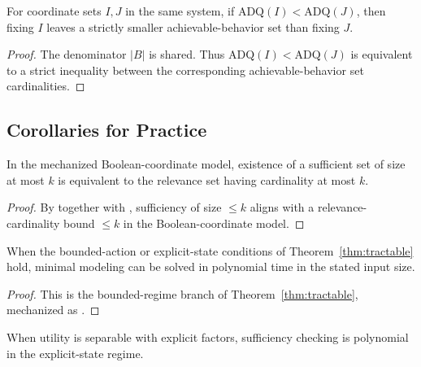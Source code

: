 \begin{proposition}\label{prop:adq-ordering}
For coordinate sets $I,J$ in the same system, if $\mathrm{ADQ}(I) < \mathrm{ADQ}(J)$, then fixing $I$ leaves a strictly smaller achievable-behavior set than fixing $J$.
\end{proposition}

\begin{proof}
The denominator $|B|$ is shared. Thus $\mathrm{ADQ}(I) < \mathrm{ADQ}(J)$ is equivalent to a strict inequality between the corresponding achievable-behavior set cardinalities.
\end{proof}

\subsection{Corollaries for Practice}

\begin{corollary}\label{cor:practice-diagnostic}
In the mechanized Boolean-coordinate model, existence of a sufficient set of size at most $k$ is equivalent to the relevance set having cardinality at most $k$.
\end{corollary}

\begin{proof}
By  together with , sufficiency of size $\le k$ aligns with a relevance-cardinality bound $\le k$ in the Boolean-coordinate model.
\end{proof}

\begin{corollary}\label{cor:practice-bounded}
When the bounded-action or explicit-state conditions of Theorem~\ref{thm:tractable} hold, minimal modeling can be solved in polynomial time in the stated input size.
\end{corollary}

\begin{proof}
This is the bounded-regime branch of Theorem~\ref{thm:tractable}, mechanized as .
\end{proof}

\begin{corollary}\label{cor:practice-structured}
When utility is separable with explicit factors, sufficiency checking is polynomial in the explicit-state regime.
\end{corollary}

